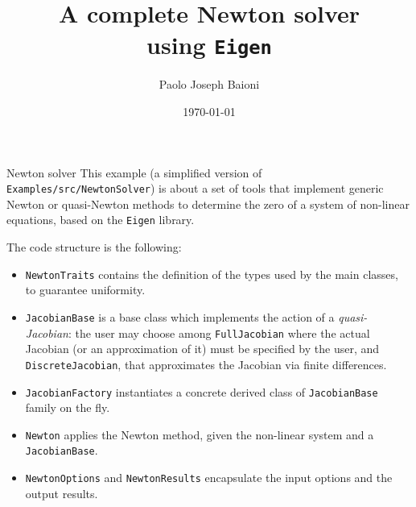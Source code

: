 \documentclass[10pt]{beamer}
\begin{document}
    \title{A complete Newton solver\protect\\ using \texttt{Eigen}}
    \author{Paolo Joseph Baioni}
    \date{\today}

\begin{frame}
    \maketitle
\end{frame}

\begin{frame}{Newton solver}
This example (a simplified version of \texttt{Examples/src/NewtonSolver}) is about a set of tools that implement generic Newton or quasi-Newton methods to determine the zero of a system of non-linear equations, based on the \texttt{Eigen} library.

The code structure is the following:
\begin{itemize}
\item \texttt{NewtonTraits} contains the definition of the types used by the main classes, to guarantee uniformity.
\item \texttt{JacobianBase} is a base class which implements the action of a \textit{quasi-Jacobian}: the user may choose among \texttt{FullJacobian} where the actual Jacobian (or an approximation of it) must be specified by the user, and \texttt{DiscreteJacobian}, that approximates the Jacobian via finite differences.
\item \texttt{JacobianFactory} instantiates a concrete derived class of \texttt{JacobianBase} family on the fly.
\item \texttt{Newton} applies the Newton method, given the non-linear system and a \texttt{JacobianBase}.
\item \texttt{NewtonOptions} and \texttt{NewtonResults} encapsulate the input options and the output results.
\end{itemize}
\end{frame}
\end{document}
